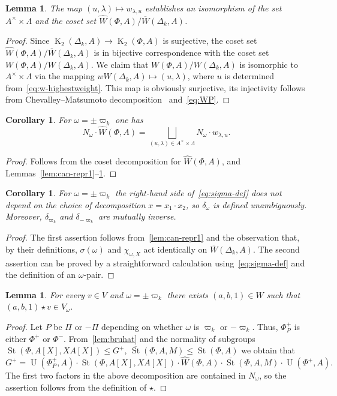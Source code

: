 \documentclass[oneside, 10pt]{amsart}
\DeclareMathOperator{\St}{St}
\DeclareMathOperator{\UU}{U}
\DeclareMathOperator{\K}{K}
\newcommand{\StW}{\widehat{W}}
\numberwithin{equation}{section}
\numberwithin{thm}{section}
\newtheorem{lemma}[thm]{Lemma}
\numberwithin{lemma}{section}
\newtheorem{cor}[thm]{Corollary}
\theoremstyle{definition}
\theoremstyle{remark}
\begin{document}
\begin{lemma} \label{lem:can-repr2}
The map $(u, \lambda) \mapsto w_{\lambda, u}$ establishes an isomorphism of the set $A^\times \times \Lambda$ and the coset set $\StW(\Phi, A) / \overline{W}(\Delta_k, A)$.
\end{lemma}
\begin{proof}
Since $\K_2(\Delta_k, A) \to \K_2(\Phi, A)$ is surjective, the coset set $\StW(\Phi, A) / \overline{W}(\Delta_k, A)$ is in bijective correspondence with the coset set
$W(\Phi, A)/W(\Delta_k, A)$.
We claim that $W(\Phi, A)/W(\Delta_k, A)$ is isomorphic to $A^\times \times \Lambda$
via the mapping $w W(\Delta_k, A) \mapsto (u, \lambda)$, where $u$ is determined from~\eqref{eq:w-highestweight}.
This map is obviously surjective, its injectivity follows from Chevalley--Matsumoto decomposition~\cite[Theorem~1.3]{St78} and~\eqref{eq:WP}.
\end{proof}

\begin{cor} \label{cor:can-repr}
For $\omega = \pm \varpi_k$ one has \[N_{\omega} \cdot \StW(\Phi, A) = \bigsqcup\limits_{(u, \lambda) \in A^\times \times \Lambda} N_{\omega} \cdot w_{\lambda, u}. \]
\end{cor}
\begin{proof}
Follows from the coset decomposition for $\StW(\Phi, A)$, and Lemmas~\ref{lem:can-repr1}--\ref{lem:can-repr2}.
\end{proof}

\begin{cor} \label{cor:can-repr2}
For $\omega = \pm\varpi_k$ the right-hand side of~\eqref{eq:sigma-def} does not depend on the choice of decomposition $x = x_1 \cdot x_2$, so $\delta_\omega$ is defined unambiguously.
Moreover, $\delta_{\varpi_k}$ and $\delta_{-\varpi_k}$ are mutually inverse.
\end{cor}
\begin{proof}
The first assertion follows from~\cref{lem:can-repr1} and the observation that, by their definitions, $\sigma(\omega)$ and $\chi_{\omega, X}$ act identically on $\overline{W}(\Delta_k, A)$.
The second assertion can be proved by a straightforward calculation using~\eqref{eq:sigma-def} and the definition of an $\omega$-pair.
\end{proof}

\begin{lemma} \label{lem:v-correctness1}
For every $v \in V$ and $\omega = \pm\varpi_k$ there exists $(a, b, 1) \in W$ such that $(a, b, 1) \star v \in V_\omega$.
\end{lemma}
\begin{proof}
Let $P$ be $\Pi$ or $-\Pi$ depending on whether $\omega$ is $\varpi_k$ or $-\varpi_k$.
Thus, $\Phi^+_P$ is either $\Phi^+$ or $\Phi^-$.
From~\cref{lem:bruhat} and the normality of subgroups $\St(\Phi, A[X], XA[X]) \leq G^+$, $\overline{\St}(\Phi, A, M) \leq \St(\Phi, A)$ we obtain that
\[G^+ = \UU(\Phi^+_P, A)\cdot \St(\Phi, A[X], XA[X]) \cdot \StW(\Phi,A)\cdot \overline{\St}(\Phi, A, M) \cdot\UU(\Phi^+, A).\]
The first two factors in the above decomposition are contained in $N_\omega$, so the assertion follows from the definition of $\star$.
\end{proof}
\end{document}
